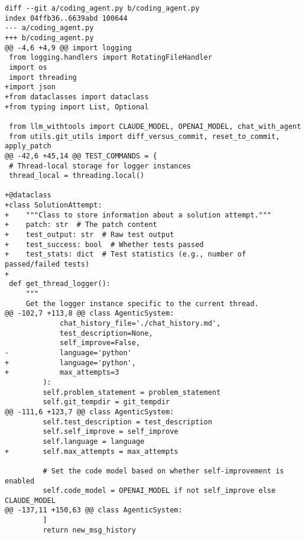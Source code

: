 \begin{lstlisting}[style=diffstyle]
diff --git a/coding_agent.py b/coding_agent.py
index 04ffb36..6639abd 100644
--- a/coding_agent.py
+++ b/coding_agent.py
@@ -4,6 +4,9 @@ import logging
 from logging.handlers import RotatingFileHandler
 import os
 import threading
+import json
+from dataclasses import dataclass
+from typing import List, Optional
 
 from llm_withtools import CLAUDE_MODEL, OPENAI_MODEL, chat_with_agent
 from utils.git_utils import diff_versus_commit, reset_to_commit, apply_patch
@@ -42,6 +45,14 @@ TEST_COMMANDS = {
 # Thread-local storage for logger instances
 thread_local = threading.local()
 
+@dataclass
+class SolutionAttempt:
+    """Class to store information about a solution attempt."""
+    patch: str  # The patch content
+    test_output: str  # Raw test output
+    test_success: bool  # Whether tests passed
+    test_stats: dict  # Test statistics (e.g., number of passed/failed tests)
+
 def get_thread_logger():
     """
     Get the logger instance specific to the current thread.
@@ -102,7 +113,8 @@ class AgenticSystem:
             chat_history_file='./chat_history.md',
             test_description=None,
             self_improve=False,
-            language='python'
+            language='python',
+            max_attempts=3
         ):
         self.problem_statement = problem_statement
         self.git_tempdir = git_tempdir
@@ -111,6 +123,7 @@ class AgenticSystem:
         self.test_description = test_description
         self.self_improve = self_improve
         self.language = language
+        self.max_attempts = max_attempts
 
         # Set the code model based on whether self-improvement is enabled
         self.code_model = OPENAI_MODEL if not self_improve else CLAUDE_MODEL
@@ -137,11 +150,63 @@ class AgenticSystem:
         ]
         return new_msg_history
 

\end{lstlisting}
